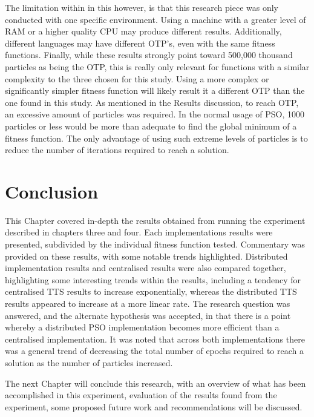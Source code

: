 \documentclass[oneside,12pt]{book}
\begin{document}
The limitation within in this however, is that this research piece was only conducted with one specific environment. Using a machine with a greater level of RAM or a higher quality CPU may produce different results. Additionally, different languages may have different OTP's, even with the same fitness functions. Finally, while these results strongly point toward 500,000 thousand particles as being the OTP, this is really only relevant for functions with a similar complexity to the three chosen for this study. Using a more complex or significantly simpler fitness function will likely result it a different OTP than the one found in this study. As mentioned in the Results discussion, to reach OTP, an excessive amount of particles was required. In the normal usage of PSO, 1000 particles or less would be more than adequate to find the global minimum of a fitness function. The only advantage of using such extreme levels of particles is to reduce the number of iterations required to reach a solution.

\section{Conclusion}
This Chapter covered in-depth the results obtained from running the experiment described in chapters three and four. Each implementations results were presented, subdivided by the individual fitness function tested. Commentary was provided on these results, with some notable trends highlighted. 
Distributed implementation results and centralised results were also compared together, highlighting some interesting trends within the results, including a tendency for centralised TTS results to increase exponentially, whereas the distributed TTS results appeared to increase at a more linear rate. The research question was answered, and the alternate hypothesis was accepted, in that there is a point whereby a distributed PSO implementation becomes more efficient than a centralised implementation. It was noted that across both implementations there was a general trend of decreasing the total number of epochs required to reach a solution as the number of particles increased.

The next Chapter will conclude this research, with an overview of what has been accomplished in this experiment, evaluation of the results found from the experiment, some proposed future work and recommendations will be discussed. 


\end{document}
